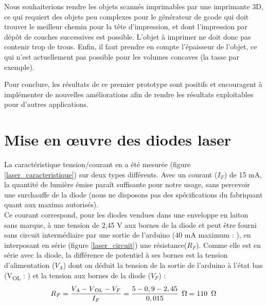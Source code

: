 \documentclass[a4paper,10pt]{report}
\begin{document}
Nous souhaiterions rendre les objets scannés imprimables par une imprimante 3D, ce qui requiert des objets peu complexes pour le générateur de gcode qui doit trouver le meilleur chemin pour la tête d'impression, et dont l'impression par dépôt de couches successives est possible. L'objet à imprimer ne doit donc pas contenir trop de trous. Enfin, il faut prendre en compte l'épaisseur de l'objet, ce qui n'est actuellement pas possible pour les volumes concaves (la tasse par exemple).

Pour conclure, les résultats de ce premier prototype sont positifs et encouragent à implémenter de nouvelles améliorations afin de rendre les résultats exploitables pour d'autres applications.

\newpage
\appendix

\chapter{Mise en \oe uvre des diodes laser}\label{diodes-laser}
La caractéristique tension/courant en a été mesurée (figure \ref{laser_caracteristique}) sur deux types différents.
Avec un courant ($I_F$) de 15 mA, la quantité de lumière émise paraît suffisante pour notre usage, sans percevoir une surchauffe de la diode (nous ne disposons pas des spécifications du fabriquant quant aux maxima autorisés).\\
Ce courant correspond, pour les diodes vendues dans une enveloppe en laiton sans marque, à une tension de 2,45 V aux bornes de la diode et peut être fourni sans circuit intermédiaire par une sortie de l'arduino (40 mA maximum :  \cite[p.~313]{ATmega}), en interposant en série (figure \ref{laser_circuit}) une résistance($R_F$). Comme elle est en série avec la diode, la différence de potentiel à ses bornes est la tension d'alimentation ($V_A$) dont on déduit la tension de la sortie de l'arduino à l'état bas (V\textsubscript{OL} : \cite[p.~313]{ATmega}) et la tension aux bornes de la diode ($V_F$) :
\begin{equation}
R_F = \frac{V_A-V\textsubscript{OL}-V_F}{I_F} = \frac{5-0,9-2,45}{0,015} \enspace \Omega = 110 \enspace \Omega
\end{equation}
\end{document}
